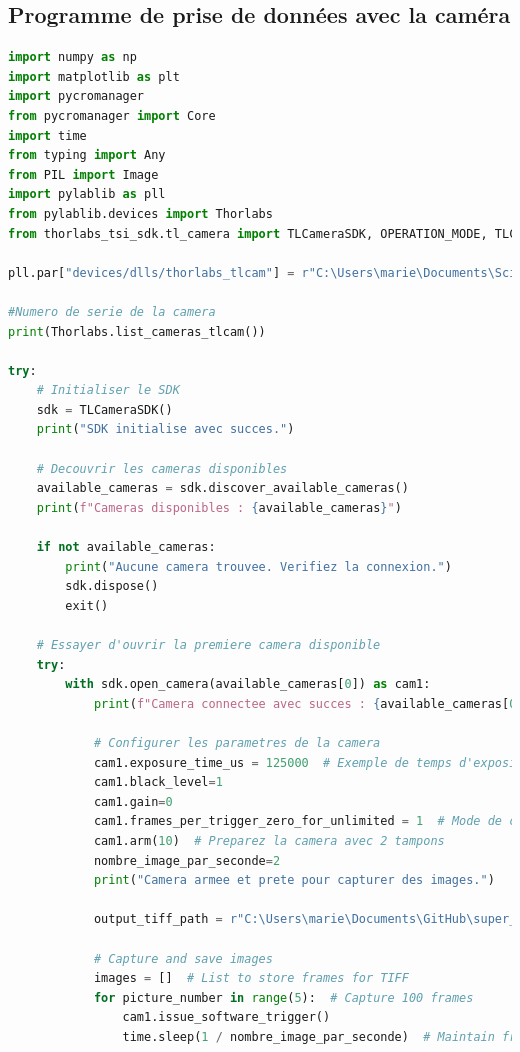 \documentclass[11pt,letterpaper]{article}
\begin{document}
\subsection{Programme de prise de données avec la caméra}

\begin{lstlisting}[language=python]
import numpy as np
import matplotlib as plt
import pycromanager
from pycromanager import Core
import time
from typing import Any
from PIL import Image
import pylablib as pll
from pylablib.devices import Thorlabs
from thorlabs_tsi_sdk.tl_camera import TLCameraSDK, OPERATION_MODE, TLCameraError

pll.par["devices/dlls/thorlabs_tlcam"] = r"C:\Users\marie\Documents\Scientific Camera Interfaces\SDK\Python Toolkit\dlls\64_lib"

#Numero de serie de la camera
print(Thorlabs.list_cameras_tlcam())

try:
    # Initialiser le SDK
    sdk = TLCameraSDK()
    print("SDK initialise avec succes.")

    # Decouvrir les cameras disponibles
    available_cameras = sdk.discover_available_cameras()
    print(f"Cameras disponibles : {available_cameras}")

    if not available_cameras:
        print("Aucune camera trouvee. Verifiez la connexion.")
        sdk.dispose()
        exit()

    # Essayer d'ouvrir la premiere camera disponible
    try:
        with sdk.open_camera(available_cameras[0]) as cam1:
            print(f"Camera connectee avec succes : {available_cameras[0]}")

            # Configurer les parametres de la camera
            cam1.exposure_time_us = 125000  # Exemple de temps d'exposition de 50 ms (tester sur Thorlab)
            cam1.black_level=1
            cam1.gain=0
            cam1.frames_per_trigger_zero_for_unlimited = 1  # Mode de capture continue : 0 ; Mode de capture ponctuel : 1
            cam1.arm(10)  # Preparez la camera avec 2 tampons
            nombre_image_par_seconde=2
            print("Camera armee et prete pour capturer des images.")
            
            output_tiff_path = r"C:\Users\marie\Documents\GitHub\super_res_microscopy\acquisition\video_output_carac_125ms_2im_poussieres.tiff"

            # Capture and save images
            images = []  # List to store frames for TIFF
            for picture_number in range(5):  # Capture 100 frames
                cam1.issue_software_trigger()
                time.sleep(1 / nombre_image_par_seconde)  # Maintain frame rate


\end{lstlisting}
\end{document}
